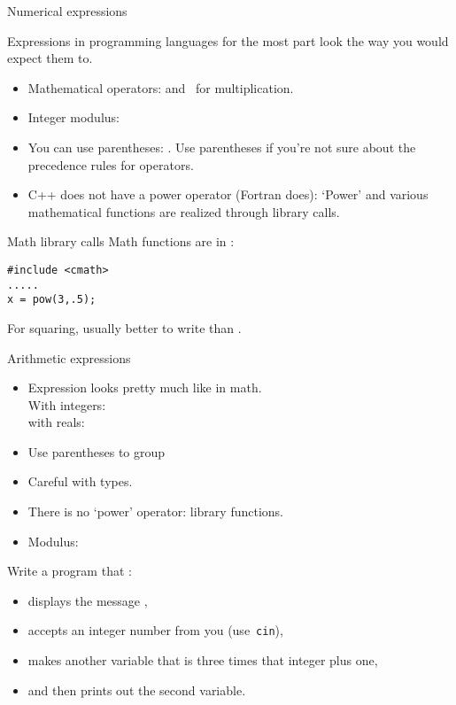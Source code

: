  {Numerical expressions}

Expressions in
programming languages for the most part look the way you would expect
them to.
\begin{itemize}
\item Mathematical operators: \n{+ - /} and \n{*}~for multiplication.
\item Integer modulus:~
\item You can use parentheses: . Use parentheses if you're
  not sure about the precedence rules for operators.
\item C++ does not have a power operator (Fortran does): `Power' and
  various mathematical functions are realized through library calls.
\end{itemize}

\begin{block}{Math library calls}
  \label{sl:cmath}
  Math functions are in :
\begin{lstlisting}
#include <cmath>
.....
x = pow(3,.5);
\end{lstlisting}
For squaring, usually better to write  than .
\end{block}

\begin{slide}{Arithmetic expressions}
  \label{sl:arith-expr}
  \begin{itemize}
  \item
    Expression looks pretty much like in math.\\
    With integers: \\
    with reals: 
  \item Use parentheses to group 
  \item Careful with types.
  \item There is no `power' operator: library functions.
  \item Modulus: 
  \end{itemize}
\end{slide}

\begin{exercise}
  \label{ex:cin-cout3np1}
  Write a program that :
  \begin{itemize}
  \item displays the message ,
  \item accepts an integer number from you (use~\lstinline{cin}),
  \item makes another variable that is three times that integer plus one,
  \item and then prints out the second variable.
  \end{itemize}
\end{exercise}


